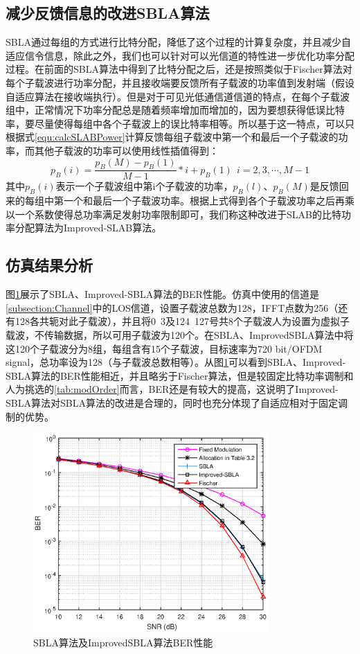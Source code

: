 \subsection{减少反馈信息的改进SBLA算法}
SBLA通过每组的方式进行比特分配，降低了这个过程的计算复杂度，并且减少自适应信令信息，除此之外，我们也可以针对可以光信道的特性进一步优化功率分配过程。在前面的SBLA算法中得到了比特分配之后，还是按照类似于Fischer算法对每个子载波进行功率分配，并且接收端要反馈所有子载波的功率值到发射端（假设自适应算法在接收端执行）。但是对于可见光低通信道信道的特点，在每个子载波组中，正常情况下功率分配总是随着频率增加而增加的，因为要想获得低误比特率，要尽量使得每组中各个子载波上的误比特率相等。所以基于这一特点，可以只根据式\ref{equ:calcSLABPower}计算反馈每组子载波中第一个和最后一个子载波的功率，而其他子载波的功率可以使用线性插值得到：
\begin{equation}
p_B(i) = \frac{p_B(M)-p_B(1)}{M-1}*i+p_B(1)\ \ i=2,3,\cdots,M-1
\end{equation}
其中$p_B(i)$表示一个子载波组中第i个子载波的功率，$p_B(l)$、$p_B(M)$是反馈回来的每组中第一个和最后一个子载波功率。根据上式得到各个子载波功率之后再乘以一个系数使得总功率满足发射功率限制即可，我们称这种改进于SLAB的比特功率分配算法为Improved-SLAB算法。

\subsection{仿真结果分析}
图\ref{fig:SBLABERonDiffAlgo}展示了SBLA、Improved-SBLA算法的BER性能。仿真中使用的信道是\ref{subsection:Channel}中的LOS信道，设置子载波总数为128，IFFT点数为256（还有128各共轭对此子载波），并且将0~3及124~127号共8个子载波人为设置为虚拟子载波，不传输数据，所以可用子载波为120个。在SBLA、ImprovedSBLA算法中将这120个子载波分为8组，每组含有15个子载波，目标速率为720 bit/OFDM signal，总功率设为128（与子载波总数相等）。从图\ref{fig:SBLABERonDiffAlgo}可以看到SBLA、Improved-SBLA算法的BER性能相近，并且略劣于Fischer算法，但是较固定比特功率调制和人为挑选的\ref{tab:modOrder}而言，BER还是有较大的提高，这说明了Improved-SBLA算法对SBLA算法的改进是合理的，同时也充分体现了自适应相对于固定调制的优势。
\begin{figure}[htbp]
\centering
\includegraphics[width=0.8\textwidth]{figures/chapter-4/SBLABERonDiffAlgo.eps}
\caption{SBLA算法及ImprovedSBLA算法BER性能}
\label{fig:SBLABERonDiffAlgo}
\end{figure}

